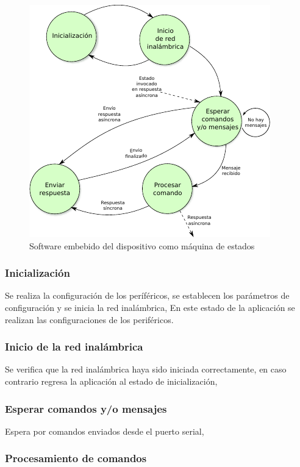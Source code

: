 \begin{figure}
	\centering
	\includegraphics[scale=1.2]{capitulo_3_imgs/app_sd.pdf}
	\caption{Software embebido del dispositivo como máquina de estados}
	\label{fig:maquina_estados_sd}
\end{figure}

\subsubsection{Inicialización}

Se realiza la configuración de los períféricos, se establecen los parámetros de configuración y se inicia la red inalámbrica,
En este estado de la aplicación se realizan las configuraciones de los periféricos. 

\subsubsection{Inicio de la red inalámbrica}

Se verifica que la red inalámbrica haya sido iniciada correctamente, en caso contrario regresa la aplicación al estado de inicialización,

\subsubsection{Esperar comandos y/o mensajes}

Espera por comandos enviados desde el puerto serial,

\subsubsection{Procesamiento de comandos}

